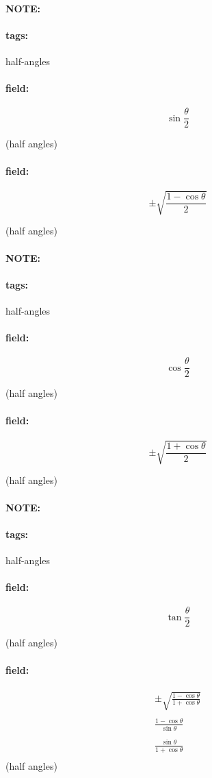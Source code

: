 \documentclass[12pt]{article}
\newenvironment{note}{\paragraph{NOTE:}}{}
\newenvironment{field}{\paragraph{field:}}{}
\newcommand*{\tags}[1]{\paragraph{tags: }#1}
\begin{document}
\begin{note}
    \tags{half-angles}
    \begin{field}
    \[  
        \sin \frac{\theta}{2}
    \] 
    \begin{center}
    (half angles)
    \end{center}
    \end{field}
    \begin{field}
    \[
        \pm \sqrt{ \frac{1 - \cos \theta }{2} } 
    \] 
    \begin{center}
    (half angles)
    \end{center}
    \end{field}
\end{note}


\begin{note}
    \tags{half-angles}
    \begin{field}
    \[  
        \cos \frac{\theta}{2}
    \] 
    \begin{center}
    (half angles)
    \end{center}
    \end{field}
    \begin{field}
    \[
        \pm \sqrt{ \frac{1 + \cos \theta }{2} } 
    \] 
    \begin{center}
    (half angles)
    \end{center}
    \end{field}
\end{note}



\begin{note}
    \tags{half-angles}
    \begin{field}
    \[  
        \tan \frac{\theta}{2}
    \] 
    \begin{center}
    (half angles)
    \end{center}
    \end{field}
    \begin{field}
        \begin{center}
        \begin{gather*}
            \pm \sqrt{ \frac{1 - \cos \theta }{1 + \cos \theta}}\\
            \\
            \frac{1 - \cos \theta}{\sin \theta}\\
            \\
            \frac{\sin \theta}{1 + \cos \theta}\\ 
        \end{gather*}
        (half angles)
        \end{center}
    \end{field}
\end{note}
\end{document}
